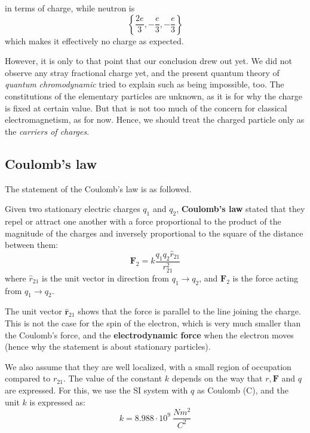 in terms of charge, while neutron is $$\left\{  \frac{2e}{3}, -\frac{e}{3}, -\frac{e}{3}  \right\}$$
which makes it effectively no charge as expected. 

However, it is only to that point that our conclusion drew out yet. We did not observe any stray fractional charge yet, and the present quantum theory of \textit{quantum chromodynamic} tried to explain such as being impossible, too. The constitutions of the elementary particles are unknown, as it is for why the charge is fixed at certain value. But that is not too much of the concern for classical electromagnetism, as for now. Hence, we should treat the charged particle only as the \textit{carriers of charges}. 

\subsection{Coulomb's law}
The statement of the Coulomb's law is as followed. 
\begin{definition}
    Given two stationary electric charges $q_{1}$ and $q_{2}$, \textbf{Coulomb's law} stated that they repel or attract one another with a force proportional to the product of the magnitude of the charges and inversely proportional to the square of the distance between them: 
    \begin{equation}
        \mathbf{F}_{2} = k \frac{q_{1}q_{2}\hat{r}_{21}}{r^{2}_{21}}
    \end{equation}
    where $\hat{r}_{21}$ is the unit vector in direction from $q_{1}\to q_{2}$, and $\mathbf{F}_{2}$ is the force acting from $q_{1}\to q_{2}$. 
\end{definition}

The unit vector $\mathbf{\hat{r}}_{21}$ shows that the force is parallel to the line joining the charge. This is not the case for the spin of the electron, which is very much smaller than the Coulomb's force, and the \textbf{electrodynamic force} when the electron moves (hence why the statement is about stationary particles). 

We also assume that they are well localized, with a small region of occupation compared to $r_{21}$. The value of the constant $k$ depends on the way that $r, \mathbf{F}$ and $q$ are expressed. For this, we use the SI system with $q$ as Coulomb (C), and the unit $k$ is expressed as: 
\begin{equation}
    k = 8.988\cdot 10^{9} \: \frac{Nm^{2}}{C^{2}}
\end{equation}

